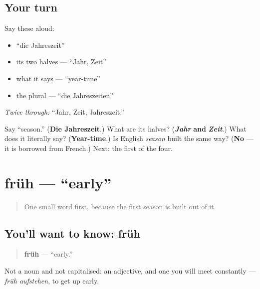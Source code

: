 \subsection*{Your turn}
Say these aloud:

\begin{itemize}
\raggedright
  \item \textquotedblleft{}die Jahreszeit\textquotedblright{}
  \item its two halves — \textquotedblleft{}Jahr, Zeit\textquotedblright{}
  \item what it says — \textquotedblleft{}year-time\textquotedblright{}
  \item the plural — \textquotedblleft{}die Jahreszeiten\textquotedblright{}
\end{itemize}

\emph{Twice through:} \textquotedblleft{}Jahr, Zeit, Jahreszeit.\textquotedblright{}

\begin{tcolorbox}[breakable,colback=teal!4,colframe=teal!35!black,title={Before you move on}]
Say \textquotedblleft{}season.\textquotedblright{} (\textbf{Die Jahreszeit}.) What are its halves? (\emph{\textbf{Jahr}} \textbf{and} \emph{\textbf{Zeit}}.) What does it literally say? (\textbf{Year-time}.) Is English \emph{season} built the same way? (\textbf{No} — it is borrowed from French.) Next: the first of the four.
\end{tcolorbox}
\section[früh]{früh — \textquotedblleft{}early\textquotedblright{}}

\label{lesson:GE-C09-frueh}



\begin{quote}
One small word first, because the first season is built out of it.
\end{quote}

\subsection*{You'll want to know: früh}
\begin{quote}
\textbf{früh} — \textquotedblleft{}early.\textquotedblright{}
\end{quote}

Not a noun and not capitalised: an adjective, and one you will meet constantly — \emph{früh aufstehen}, to get up early.


